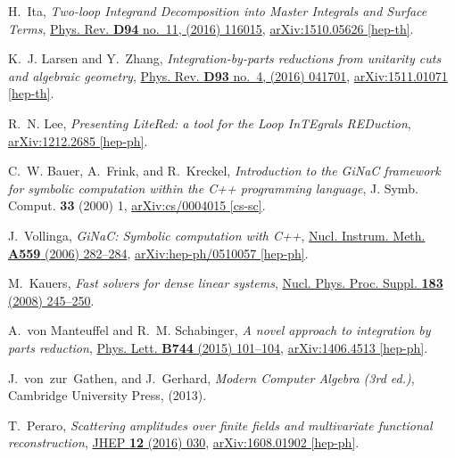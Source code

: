 \documentclass[a4paper,12pt]{scrartcl}
\begin{document}
\begin{thebibliography}{10}
H.~Ita, {\em {Two-loop Integrand Decomposition into Master Integrals and
  Surface Terms}}, \href{http://dx.doi.org/10.1103/PhysRevD.94.116015}{Phys.
  Rev. {\bfseries D94} no.~11, (2016) 116015},
\href{http://arxiv.org/abs/1510.05626}{{\ttfamily arXiv:1510.05626 [hep-th]}}.

K.~J. Larsen and Y.~Zhang, {\em {Integration-by-parts reductions from unitarity
  cuts and algebraic geometry}},
  \href{http://dx.doi.org/10.1103/PhysRevD.93.041701}{Phys. Rev. {\bfseries
  D93} no.~4, (2016) 041701},
\href{http://arxiv.org/abs/1511.01071}{{\ttfamily arXiv:1511.01071 [hep-th]}}.

R.~N. Lee, {\em {Presenting LiteRed: a tool for the Loop InTEgrals REDuction}},
\href{http://arxiv.org/abs/1212.2685}{{\ttfamily arXiv:1212.2685 [hep-ph]}}.

C.~W. Bauer, A.~Frink, and R.~Kreckel, {\em {Introduction to the GiNaC
  framework for symbolic computation within the C++ programming language}}, J.
  Symb. Comput. {\bfseries 33} (2000) 1,
\href{http://arxiv.org/abs/cs/0004015}{{\ttfamily arXiv:cs/0004015 [cs-sc]}}.

J.~Vollinga, {\em {GiNaC: Symbolic computation with C++}},
  \href{http://dx.doi.org/10.1016/j.nima.2005.11.155}{Nucl. Instrum. Meth.
  {\bfseries A559} (2006) 282--284},
\href{http://arxiv.org/abs/hep-ph/0510057}{{\ttfamily arXiv:hep-ph/0510057
  [hep-ph]}}.

M.~Kauers, {\em {Fast solvers for dense linear systems}},
\href{http://dx.doi.org/10.1016/j.nuclphysbps.2008.09.111}{Nucl. Phys. Proc.
  Suppl. {\bfseries 183} (2008) 245--250}.

A.~von Manteuffel and R.~M. Schabinger, {\em {A novel approach to integration
  by parts reduction}},
  \href{http://dx.doi.org/10.1016/j.physletb.2015.03.029}{Phys. Lett.
  {\bfseries B744} (2015) 101--104},
\href{http://arxiv.org/abs/1406.4513}{{\ttfamily arXiv:1406.4513 [hep-ph]}}.

J.~von~zur~Gathen, and J.~Gerhard, {\em {Modern Computer Algebra (3rd ed.)}},
  Cambridge University Press, (2013).

T.~Peraro, {\em {Scattering amplitudes over finite fields and multivariate
  functional reconstruction}},
  \href{http://dx.doi.org/10.1007/JHEP12(2016)030}{JHEP {\bfseries 12} (2016)
  030},
\href{http://arxiv.org/abs/1608.01902}{{\ttfamily arXiv:1608.01902 [hep-ph]}}.


\end{thebibliography}
\end{document}

